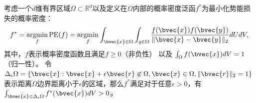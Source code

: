 \begin{theorem}[决策边界的表征分布非零]
\label{thm:peloss:border-distribution}
    考虑一个$d$维有界区域$\Omega \subset \mathbb R^d$以及定义在$\Omega$内部的概率密度泛函$f^*$为最小化势能损失的概率密度：
    \begin{equation}
        \label{eq:peloss:potential-min}
        f^* = \mathop\textnormal{argmin}_f \textnormal{PE}(f) = \mathop\textnormal{argmin}_{f} \int_{\bvec{x} \in \Omega} \int_{y \in \Omega} \dfrac{f(\bvec{x})f(\bvec{y})}{\Vert \bvec{x} - \bvec{y} \Vert_2} dUdV,
    \end{equation}
    其中，$f$表示概率密度函数且满足$f \ge 0$（非负性） 以及 $\int_{\Omega} f(\bvec{x})dV = 1$（归一性）。
    令$\Delta_\epsilon \Omega = \{\bvec{x}: \bvec{x} + \epsilon \bvec{r} \not\in \Omega, \bvec{x} \in \Omega, \Vert \bvec{r} \Vert_2 = 1 \}$ 表示距离$\Omega$边界距离小于$\epsilon$的区域，那么$f^*$满足对于任意$\epsilon > 0$，有$\int_{\bvec{x}\in\Delta_\epsilon \Omega} f^*(\bvec{x})dV > 0$。
\end{theorem}
